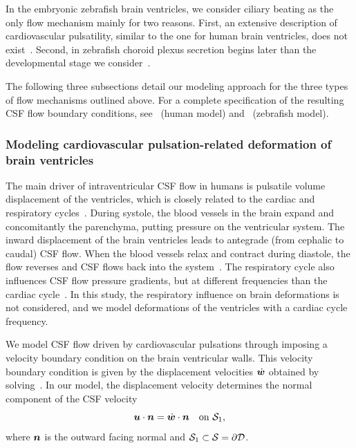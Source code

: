 \documentclass{template}
\begin{document}
In the embryonic zebrafish brain ventricles, we consider ciliary beating as
the only flow mechanism mainly for two reasons. First, an extensive description
of cardiovascular pulsatility, similar to the one for human brain ventricles,
does not exist~\citep{Herlyng2025AdvectionDiffusion}.
Second, in zebrafish choroid plexus secretion begins later than 
the developmental stage we consider~\citep{bill2008development}. 

The following three subsections detail our modeling approach for the three
types of flow mechanisms outlined above. For a complete specification of
the resulting CSF flow boundary conditions, see~ (human model)
and~ (zebrafish model).

\subsubsection{Modeling cardiovascular pulsation-related deformation of brain ventricles}
\label{subsubsec:deformation}
The main driver of intraventricular CSF flow in humans is pulsatile volume displacement
of the ventricles, which is closely related to the cardiac and respiratory cycles~\citep{wagshul2011pulsating,
Vinje2019RespiratoryMeasurements, sweetman2011cerebrospinal, baledent2001cerebrospinal, Neumaier2025}. 
During systole, the blood vessels in the brain expand and concomitantly
the parenchyma, putting pressure on the ventricular system. The inward displacement
of the brain ventricles leads to antegrade (from cephalic to caudal) CSF flow.
When the blood vessels relax and contract during diastole, the flow reverses and
CSF flows back into the system~\citep{sweetman2011cerebrospinal, greitz1992pulsatile}.
The respiratory cycle also influences CSF flow pressure 
gradients, but at different frequencies
than the cardiac cycle~\citep{Vinje2019RespiratoryMeasurements}.
In this study, the respiratory influence on brain deformations is not considered,
and we model deformations of the ventricles with a cardiac cycle frequency.

We model CSF flow driven by cardiovascular pulsations
through imposing a velocity boundary condition on the
brain ventricular walls. This velocity boundary condition
is given by the displacement velocities $\dot{\bm{w}}$ obtained 
by solving~.
In our model, the displacement velocity determines the normal component
of the CSF velocity
\begin{equation}
    \bm{u}\cdot\bm{n} = \dot{\bm{w}}\cdot\bm{n} \quad\text{on }\mathcal{S}_1,
\end{equation}
where $\bm{n}$ is the outward facing normal and 
$\mathcal{S}_1\subset\mathcal{S} = \partial\mathcal{D}$.
\end{document}
